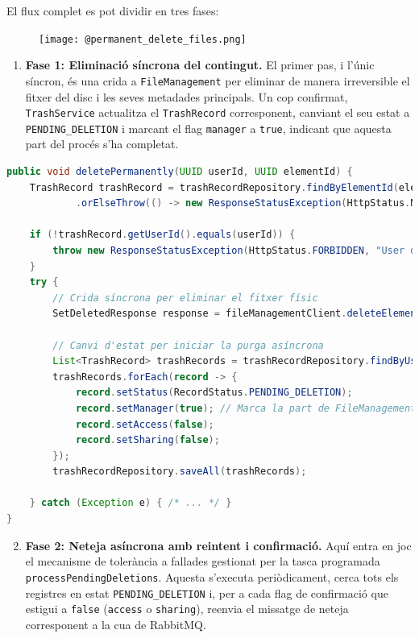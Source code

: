 El flux complet es pot dividir en tres fases:

\begin{figure}[H]
    \centering
    \texttt{[image: @permanent\_delete\_files.png]}
\end{figure}

\begin{enumerate}
    \item \textbf{Fase 1: Eliminació síncrona del contingut.} El primer pas, i l'únic síncron, és una crida a \texttt{FileManagement} per eliminar de manera irreversible el fitxer del disc i les seves metadades principals. Un cop confirmat, \texttt{TrashService} actualitza el \texttt{TrashRecord} corresponent, canviant el seu estat a \texttt{PENDING\_DELETION} i marcant el flag \texttt{manager} a \texttt{true}, indicant que aquesta part del procés s'ha completat.
\end{enumerate}

\begin{lstlisting}[language=Java, caption={Inici de l'eliminació permanent a `TrashService`}]
public void deletePermanently(UUID userId, UUID elementId) {
    TrashRecord trashRecord = trashRecordRepository.findByElementId(elementId)
            .orElseThrow(() -> new ResponseStatusException(HttpStatus.NOT_FOUND, "Element not found..."));

    if (!trashRecord.getUserId().equals(userId)) {
        throw new ResponseStatusException(HttpStatus.FORBIDDEN, "User does not have permission...");
    }
    try {
        // Crida síncrona per eliminar el fitxer físic
        SetDeletedResponse response = fileManagementClient.deleteElementPermanently(elementId);
        
        // Canvi d'estat per iniciar la purga asíncrona
        List<TrashRecord> trashRecords = trashRecordRepository.findByUserIdAndElementIdIn(userId, response.getElementIds());
        trashRecords.forEach(record -> {
            record.setStatus(RecordStatus.PENDING_DELETION);
            record.setManager(true); // Marca la part de FileManagement com a feta
            record.setAccess(false);
            record.setSharing(false);
        });
        trashRecordRepository.saveAll(trashRecords);

    } catch (Exception e) { /* ... */ }
}
\end{lstlisting}

\begin{enumerate}
    \setcounter{enumi}{1}
    \item \textbf{Fase 2: Neteja asíncrona amb reintent i confirmació.} Aquí entra en joc el mecanisme de tolerància a fallades gestionat per la tasca programada \texttt{processPendingDeletions}. Aquesta s'executa periòdicament, cerca tots els registres en estat \texttt{PENDING\_DELETION} i, per a cada flag de confirmació que estigui a \texttt{false} (\texttt{access} o \texttt{sharing}), reenvia el missatge de neteja corresponent a la cua de RabbitMQ.
\end{enumerate}

